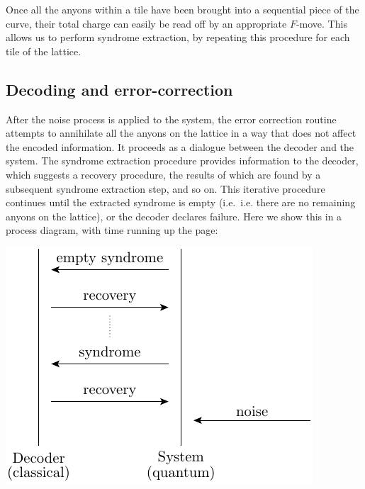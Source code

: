 \documentclass[aps, letterpaper, onecolumn, superscriptaddress, notitlepage, 10pt]{revtex4-1}
\begin{document}

Once all the anyons within a tile have been brought into a sequential piece of the curve, their total charge can easily be read off by an appropriate $F$-move. This allows us to perform syndrome extraction, by repeating this procedure for each tile of the lattice.

%
%

\subsection{Decoding and error-correction}

After the noise process is applied to the system,
the error correction routine attempts to annihilate all the anyons on the lattice in a way that does not affect the encoded information. It proceeds as a dialogue between the
decoder and the system. The syndrome extraction procedure provides information to the decoder, which suggests a recovery procedure, the results of which are found by a subsequent syndrome extraction step, and so on. This iterative procedure continues until the extracted syndrome is empty (i.e.~i.e. there are no remaining anyons on the lattice), or the decoder declares failure.
%
Here we show this in a process diagram, with time running up
the page:
\begin{center}
\includegraphics[]{pic-process.pdf}
\end{center}
\end{document}
